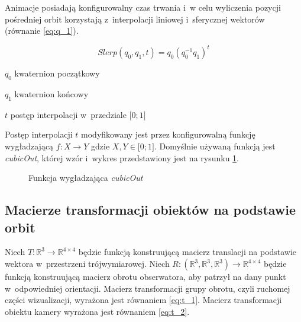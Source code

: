 Animacje posiadają konfigurowalny czas trwania i~w celu wyliczenia pozycji pośredniej orbit korzystają z~interpolacji liniowej i~sferycznej\cite{Slerp} wektorów (równanie \ref{eq:q_1}).
\begin{samepage}
    \begin{equation}
      \label{eq:q_1}
        Slerp (q_0, q_1, t) = q_0(q_0^{-1} q_1)^t
    \end{equation}
    \begin{eqexpl}[25mm]
        \item {$q_0$} kwaternion początkowy
        \item {$q_1$} kwaternion końcowy
        \item {$t$} postęp interpolacji w~przedziale $\lbrack0;1\rbrack$
    \end{eqexpl}
    \vspace{\baselineskip}
\end{samepage}
\begin{multicols}{2}
    
    Postęp interpolacji $t$ modyfikowany jest przez konfigurowalną funkcję wygładzającą \mbox{$f: X \to Y$} gdzie \mbox{$X, Y \in \lbrack0;1\rbrack$}. Domyślnie używaną funkcją jest \textit{cubicOut}, której wzór i~wykres przedstawiony jest na rysunku \ref{fig:ease_1}.
    
    \columnbreak

    \begin{figure}[H]
        \centering
        \caption{Funkcja wygładzająca \textit{cubicOut}}
        \label{fig:ease_1}
    \end{figure}
    
\end{multicols}

\subsection{Macierze transformacji obiektów na podstawie orbit}

Niech $T : \mathbb{R}^3 \to \mathbb{R}^{4\times4}$ będzie funkcją konstruującą macierz translacji na podstawie wektora w~przestrzeni trójwymiarowej. Niech $R : (\mathbb{R}^3, \mathbb{R}^3, \mathbb{R}^3) \to \mathbb{R}^{4\times4}$ będzie funkcją konstruującą macierz obrotu obserwatora, aby patrzył na dany punkt w~odpowiedniej orientacji. Macierz transformacji grupy obrotu, czyli ruchomej części wizualizacji, wyrażona jest równaniem \ref{eq:t_1}. Macierz transformacji obiektu kamery wyrażona jest równaniem \ref{eq:t_2}.


